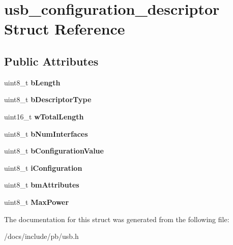 \hypertarget{structusb__configuration__descriptor}{}\section{usb\+\_\+configuration\+\_\+descriptor Struct Reference}
\label{structusb__configuration__descriptor}
\subsection*{Public Attributes}
\begin{DoxyCompactItemize}
\item 
\mbox{\label{structusb__configuration__descriptor_ab9c6c2de84915b82847ca49167596fb4}} 
uint8\+\_\+t {\bfseries b\+Length}
\item 
\mbox{\label{structusb__configuration__descriptor_a422f4aaad90b35ad0d673ef979226193}} 
uint8\+\_\+t {\bfseries b\+Descriptor\+Type}
\item 
\mbox{\label{structusb__configuration__descriptor_a3bab127754404e5aa3a84a7c71faf384}} 
uint16\+\_\+t {\bfseries w\+Total\+Length}
\item 
\mbox{\label{structusb__configuration__descriptor_ac25b62cff61550327f9d0e75a83a80dc}} 
uint8\+\_\+t {\bfseries b\+Num\+Interfaces}
\item 
\mbox{\label{structusb__configuration__descriptor_af28ee6897bc865285877fc30d4daef72}} 
uint8\+\_\+t {\bfseries b\+Configuration\+Value}
\item 
\mbox{\label{structusb__configuration__descriptor_ae4daf96c6127c8a04d3a10f709832491}} 
uint8\+\_\+t {\bfseries i\+Configuration}
\item 
\mbox{\label{structusb__configuration__descriptor_a071e054db03712a2fe12207afaf09d95}} 
uint8\+\_\+t {\bfseries bm\+Attributes}
\item 
\mbox{\label{structusb__configuration__descriptor_af278db8803b7a8939f3ca202965e14c3}} 
uint8\+\_\+t {\bfseries Max\+Power}
\end{DoxyCompactItemize}


The documentation for this struct was generated from the following file\+:\begin{DoxyCompactItemize}
\item 
/docs/include/pb/usb.\+h\end{DoxyCompactItemize}

